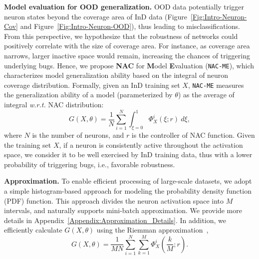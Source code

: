 \documentclass{article} \usepackage{iclr2024_conference,times}
\newcommand{\bfstart}[1]{\noindent\textbf{#1.}}
\begin{document}
\bfstart{Model evaluation for OOD generalization} 
OOD data potentially trigger neuron states beyond the coverage area of InD data (Figure~\ref{Fig:Intro-Neuron-Cov} and Figure~\ref{Fig:Intro-Neuron-OOD}), thus leading to misclassifications. 
From this perspective, we hypothesize that the robustness of networks could positively correlate with the size of coverage area.
For instance, as coverage area narrows, larger inactive space would remain, increasing the chances of triggering underlying bugs.
Hence, we propose \textbf{NAC} for \textbf{M}odel \textbf{E}valuation (\texttt{NAC-ME}), which characterizes model generalization ability based on the integral of neuron coverage distribution. 
Formally, given an InD training set $X$, \texttt{NAC-ME} measures the generalization ability of a model (parameterized by $\theta$) as the average of integral \textit{w.r.t.} NAC distribution:
\begin{equation}
	G(X, \theta)=\frac{1}{N}  \sum_{i=1}^{N}\int_{\xi=0}^{1} \Phi_{X}^{i}(\xi;r)~d\xi,
\end{equation}
where 
$N$ is the number of neurons, and $r$ is the controller of NAC function. 
Given the training set $X$, if a neuron is consistently active throughout the activation space, we consider it to be well exercised by InD training data, thus with a lower probability of triggering bugs, i.e., favorable robustness.













\bfstart{Approximation} 
To enable efficient processing of large-scale datasets, we adopt a simple histogram-based approach for modeling the probability density function (PDF) function.  This approach divides the neuron activation space into $M$ intervals, and naturally supports mini-batch approximation. We provide more details in  Appendix~\ref{Appendix:Approximation_Details}.
In addition, we efficiently calculate $G(X,\theta)$ using the Riemman approximation~\citep{Rieman}, 
\vspace{-1mm}
\begin{equation}
	G(X, \theta) = \frac{1}{MN} \sum_{i=1}^{N}\sum_{k=1}^{M}\Phi_{X}^{i}(\frac{k}{M}; r).
	\label{Eq:OOD_Eval_Approximation}
\end{equation}
\end{document}
